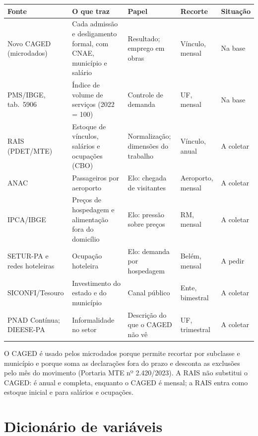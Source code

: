 \begin{table}[H]
\centering\small
\begin{tabularx}{\linewidth}{>{\raggedright}p{3.1cm}LLp{2.3cm}l}
\toprule
\textbf{Fonte} & \textbf{O que traz} & \textbf{Papel} & \textbf{Recorte} & \textbf{Situação}\\
\midrule
Novo CAGED (microdados) & Cada admissão e desligamento formal, com CNAE, município e salário & Resultado; emprego em obras & Vínculo, mensal & Na base\\
PMS/IBGE, tab.\ 5906 & Índice de volume de serviços (2022 = 100) & Controle de demanda & UF, mensal & Na base\\
RAIS (PDET/MTE) & Estoque de vínculos, salários e ocupações (CBO) & Normalização; dimensões do trabalho & Vínculo, anual & A coletar\\
ANAC & Passageiros por aeroporto & Elo: chegada de visitantes & Aeroporto, mensal & A coletar\\
IPCA/IBGE & Preços de hospedagem e alimentação fora do domicílio & Elo: pressão sobre preços & RM, mensal & A coletar\\
SETUR-PA e redes hoteleiras & Ocupação hoteleira & Elo: demanda por hospedagem & Belém, mensal & A pedir\\
SICONFI/Tesouro & Investimento do estado e do município & Canal público & Ente, bimestral & A coletar\\
PNAD Contínua; DIEESE-PA & Informalidade no setor & Descrição do que o CAGED não vê & UF, trimestral & A coletar\\
\bottomrule
\end{tabularx}
\end{table}

O CAGED é usado pelos microdados porque permite recortar por subclasse e município e porque soma as
declarações fora do prazo e desconta as exclusões pelo mês do movimento (Portaria MTE nº 2.420/2023).
A RAIS não substitui o CAGED: é anual e completa, enquanto o CAGED é mensal; a RAIS entra como
estoque inicial e para salários e ocupações.


\section{Dicionário de variáveis}

